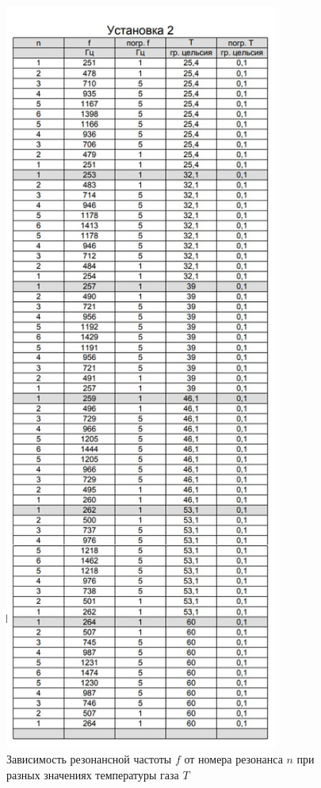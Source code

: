 \documentclass[a4paper,12pt]{article}
\begin{document}
\begin{figure}[htpb!]
\centering
\includegraphics[width=90mm]{table2.jpg}
\caption{Зависимость резонансной частоты $f$ от номера резонанса $n$ при разных значениях температуры газа $T$}
\end{figure}
 
\end{document}
